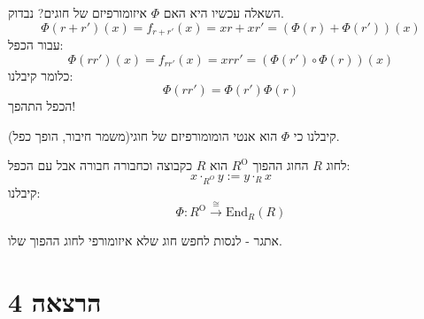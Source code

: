 \documentclass{tstextbook}
\begin{document}
השאלה עכשיו היא האם \(\Phi\) איזומורפיזם של חוגים?
נבדוק.
$$\Phi(r+r')(x)=f_{r+r'}(x)=xr+xr'=(\Phi(r)+\Phi(r'))(x)$$
עבור הכפל:
$$\Phi(rr')(x)=f_{rr'}(x)=xrr'=(\Phi(r')\circ  \Phi(r))(x)$$
כלומר קיבלנו:
$$\Phi(rr')=\Phi(r')\Phi(r)$$
הכפל התהפך!

קיבלנו כי \(\Phi\) הוא אנטי הומומורפיזם של חוגי(משמר חיבור, הופך כפל).

\begin{definition}
לחוג \(R\) החוג ההפוך \(R^{\text{O}}\) הוא \(R\) כקבוצה וכחבורה חבורה אבל עם הכפל:
$$x\cdot_{R^{O}}y := y\cdot_{R} x$$
קיבלנו:
$$\Phi:R^{\text{O}}\xrightarrow{\cong }\mathrm{End}_{R}(R)$$

\end{definition}
אתגר - לנסות לחפש חוג שלא איזומורפי לחוג ההפוך שלו.

\section{הרצאה 4}
\end{document}
